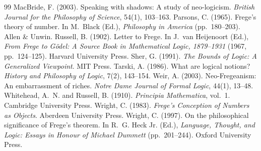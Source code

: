 \documentclass{situationist-preprint}
\begin{document}
\begin{thebibliography}{99}
 MacBride, F. (2003). Speaking with shadows: A study of neo-logicism. \emph{British Journal for the Philosophy of Science}, 54(1), 103--163.
 Parsons, C. (1965). Frege's theory of number. In M.~Black (Ed.), \emph{Philosophy in America} (pp.~180--203). Allen \& Unwin.
 Russell, B. (1902). Letter to Frege. In J.~van Heijenoort (Ed.), \emph{From Frege to G\"odel: A Source Book in Mathematical Logic, 1879--1931} (1967, pp.~124--125). Harvard University Press.
 Sher, G. (1991). \emph{The Bounds of Logic: A Generalized Viewpoint}. MIT Press.
 Tarski, A. (1986). What are logical notions? \emph{History and Philosophy of Logic}, 7(2), 143--154.
 Weir, A. (2003). Neo-Fregeanism: An embarrassment of riches. \emph{Notre Dame Journal of Formal Logic}, 44(1), 13--48.
 Whitehead, A.~N. and Russell, B. (1910). \emph{Principia Mathematica}, vol.~1. Cambridge University Press.
 Wright, C. (1983). \emph{Frege's Conception of Numbers as Objects}. Aberdeen University Press.
 Wright, C. (1997). On the philosophical significance of Frege's theorem. In R.~G. Heck Jr. (Ed.), \emph{Language, Thought, and Logic: Essays in Honour of Michael Dummett} (pp.~201--244). Oxford University Press.
\end{thebibliography}
\end{document}
